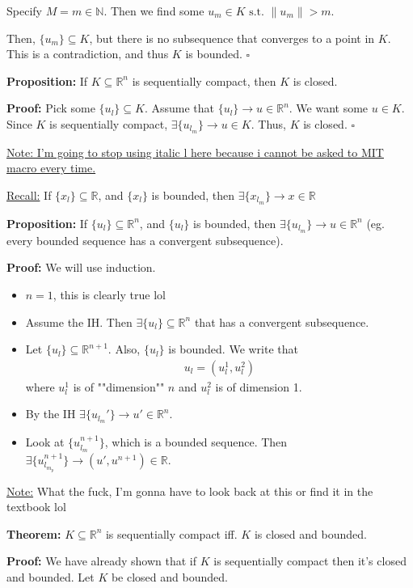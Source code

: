 \documentclass{article}
\newcommand*{\qed}{\hfill$\square$}%
\newcommand*{\txt}[1]{\text{ #1 }}%
\newcommand*{\rr}{\mathbb{R}}%
\begin{document}
Specify $M=m\in \mathbb{N}$. Then we find some $u_m\in K\txt{s.t.} \|u_m\|>m$. 

Then, $\{u_m\}\subseteq K$, but there is no subsequence that converges to a point in $K$. This is a contradiction, and thus $K$ is bounded. \qed

\textbf{Proposition:} If $K\subseteq \rr^n$ is sequentially compact, then $K$ is closed.

\textbf{Proof:} Pick some $\{u_\mathit{l}\}\subseteq K$. Assume that $\{u_\mathit{l}\}\to u\in \rr^n$. We want some $u\in K$. Since $K$ is sequentially compact, $\exists \{u_{\mathit{l}_m}\}\to u\in K$. Thus, $K$ is closed. \qed

\underline{Note: I'm going to stop using italic l here because i cannot be asked to MIT macro every time.}

\underline{Recall:} If $\{x_l\}\subseteq \rr$, and $\{x_l\}$ is bounded, then $\exists \{x_{l_m}\}\to x\in \rr$

\textbf{Proposition:} If $\{u_l\}\subseteq \rr^n$, and $\{u_l\}$ is bounded, then $\exists \{u_{l_m}\}\to u\in \rr^n$ (eg. every bounded sequence has a convergent subsequence).

\textbf{Proof:} We will use induction. \begin{itemize}
    \item $n=1$, this is clearly true lol 
    \item Assume the IH. Then $\exists \{u_l\}\subseteq \rr^n$ that has a convergent subsequence. 
    \item Let $\{u_l\}\subseteq \rr^{n+1}$. Also, $\{u_l\}$ is bounded. We write that \begin{align*}
        u_l=(u_l^1,u_l^2)
    \end{align*}
    where $u_l^1$ is of ""dimension"" $n$ and $u_l^2$ is of dimension 1.
    \item By the IH $\exists \{u_{l_m}'\}\to u'\in \rr^n$. 
    \item Look at $\{u_{l_m}^{n+1}\}$, which is a bounded sequence. Then $\exists \{u_{l_{m_p}}^{n+1}\}\to (u',u^{n+1})\in \rr$.
\end{itemize}

\underline{Note:} What the fuck, I'm gonna have to look back at this or find it in the textbook lol

\textbf{Theorem:} $K\subseteq \rr^n$ is sequentially compact iff. $K$ is closed and bounded. 

\textbf{Proof:} We have already shown that if $K$ is sequentially compact then it's closed and bounded. Let $K$ be closed and bounded. 
\end{document}
